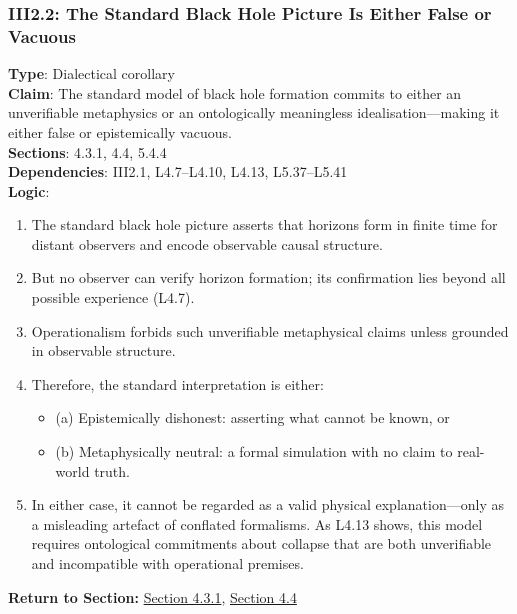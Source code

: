\documentclass[12pt]{book}
\begin{document}
\subsubsection*{III2.2: The Standard Black Hole Picture Is Either False or Vacuous}
\label{appendix:III2.2}
\textbf{Type}: Dialectical corollary\\
\textbf{Claim}: The standard model of black hole formation commits to either an unverifiable metaphysics or an ontologically meaningless idealisation---making it either false or epistemically vacuous.\\
\textbf{Sections}: 4.3.1, 4.4, 5.4.4\\
\textbf{Dependencies}: III2.1, L4.7–L4.10, L4.13, L5.37–L5.41\\
\textbf{Logic}:
\begin{enumerate}
  \item The standard black hole picture asserts that horizons form in finite time for distant observers and encode observable causal structure.
  \item But no observer can verify horizon formation; its confirmation lies beyond all possible experience (L4.7).
  \item Operationalism forbids such unverifiable metaphysical claims unless grounded in observable structure.
  \item Therefore, the standard interpretation is either:
  \begin{itemize}
    \item (a) Epistemically dishonest: asserting what cannot be known, or
    \item (b) Metaphysically neutral: a formal simulation with no claim to real-world truth.
  \end{itemize}
  \item In either case, it cannot be regarded as a valid physical explanation---only as a misleading artefact of conflated formalisms. As L4.13 shows, this model requires ontological commitments about collapse that are both unverifiable and incompatible with operational premises.
\end{enumerate}
\textbf{Return to Section:} \hyperref[sec:4.3.1]{Section 4.3.1}, \hyperref[sec:4.4]{Section 4.4}
\end{document}
